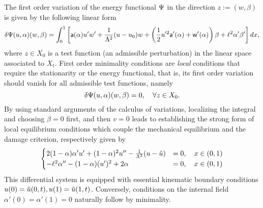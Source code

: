The first order variation of the energy functional $\Psi$ in the direction   $z:=(w, \beta)$ is given by the following linear form  
\begin{equation}
    \delta \Psi(u,\alpha)(w,\beta)=\int_0^1
\left[\mathsf{a}(\alpha)u'w'+\frac{1}{\Lambda^2} (u-u_0) w+ \left( \frac{1}{2}u'^2 \mathsf{a}'(\alpha)+\mathsf{w}'(\alpha) \right)\beta+\ell^2\alpha'\beta' \right]dx,\label{firstvar1}
\end{equation}
where 
$z\in X_0$ is a test function (an admissible perturbation) in the linear space associated to $X_t$. First order minimality conditions are \emph{local} conditions that require the stationarity or the energy functional, that is, its first order variation should vanish for all admissible test functions, namely
\begin{equation}
    \label{eq:stationarity}
    \delta \Psi(u,\alpha)(w,\beta)=0, \quad \forall z\in X_0.
\end{equation}
By using standard arguments of the calculus of variations, localizing the integral and choosing $\beta = 0$ first, and then $v =0$ leads to establishing the strong form of local equilibrium conditions which couple the mechanical equilibrium and the damage criterion, respectively given by
\begin{eqnarray}
\begin{cases}
  2(1-\alpha)\alpha' u' +(1-\alpha)^2 u'' -  \frac{1}{\Lambda^2}(u-\tilde u) &= 0, \quad {x\in (0, 1)}\\
  -\ell^2\alpha'' - (1-\alpha)( u')^2 + 2\alpha   &= 0, \quad {x\in (0, 1)}
\end{cases}
\label{auto1}
\end{eqnarray}
This differential system is equipped with essential kinematic boundary conditions $u(0) = \tilde u(0, t), u(1) = \tilde u(1, t)$. Conversely, conditions on the internal field $\alpha'(0)=\alpha'(1)=0$ naturally follow by minimality.
